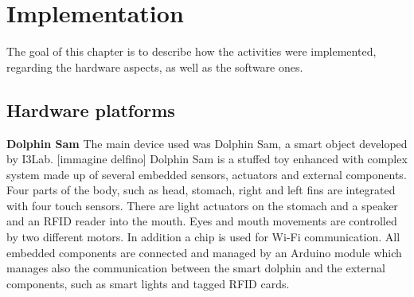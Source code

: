 	\chapter{Implementation}
	The goal of this chapter is to describe how the activities were implemented, regarding the hardware aspects, as well as the software ones.
	\section{Hardware platforms}
	{\textbf{\Large Dolphin Sam}} \newline \newline
	The main device used was Dolphin Sam, a smart object developed by I3Lab.
	[immagine delfino] \newline
	\noindent
	Dolphin Sam is a stuffed toy enhanced with complex system made	up of several embedded sensors, actuators and external components. Four parts of the body, such as head, stomach, right and left fins are integrated with four touch sensors. There are light actuators on the stomach and a speaker and an RFID reader into the mouth. Eyes and mouth movements are controlled by two different motors. In addition a chip is used for Wi-Fi communication. \newline
	All embedded components are connected and managed by an Arduino module which manages also the communication between the smart dolphin and the external components, such as smart lights and tagged RFID cards.
	
	
	
	

		
